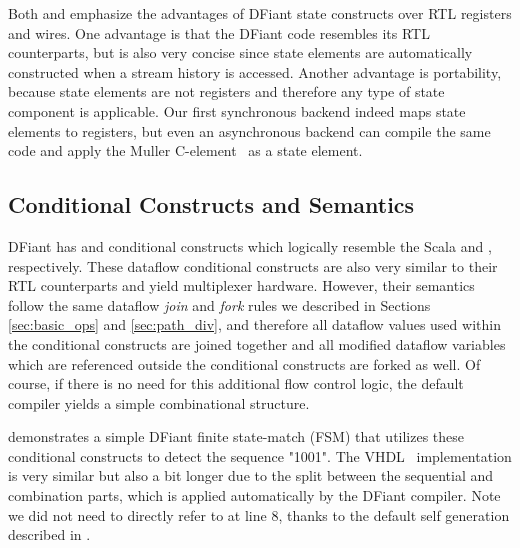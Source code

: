 Both  and  emphasize the advantages of DFiant state constructs over RTL registers and wires.
One advantage is that the DFiant code resembles its RTL counterparts, but is also very concise since state elements are automatically constructed when a stream history is accessed. Another advantage is portability, because state elements are not registers and therefore any type of state component is applicable. Our first synchronous backend indeed maps state elements to registers, but even an asynchronous backend can compile the same code and apply the Muller C-element~\cite{muller1957theory} as a state element. 

\subsection{Conditional Constructs and Semantics}
\label{sec:conditional}
DFiant has  and  conditional constructs which logically resemble the Scala  and , respectively. These dataflow conditional constructs are also very similar to their RTL counterparts and yield multiplexer hardware. However, their semantics follow the same dataflow \emph{join} and \emph{fork} rules we described in Sections \ref{sec:basic_ops} and \ref{sec:path_div}, and therefore all dataflow values used within the conditional constructs are joined together and all modified dataflow variables which are referenced outside the conditional constructs are forked as well. Of course, if there is no need for this additional flow control logic, the default compiler yields a simple combinational structure.

 demonstrates a simple DFiant finite state-match (FSM) that utilizes these conditional constructs to detect the sequence "1001". The VHDL~\cite{seqdetvhdl} implementation is very similar but also a bit longer due to the split between the sequential and combination parts, which is applied automatically by the DFiant compiler.
Note we did not need to directly refer to  at line 8, thanks to the default self generation described in .

